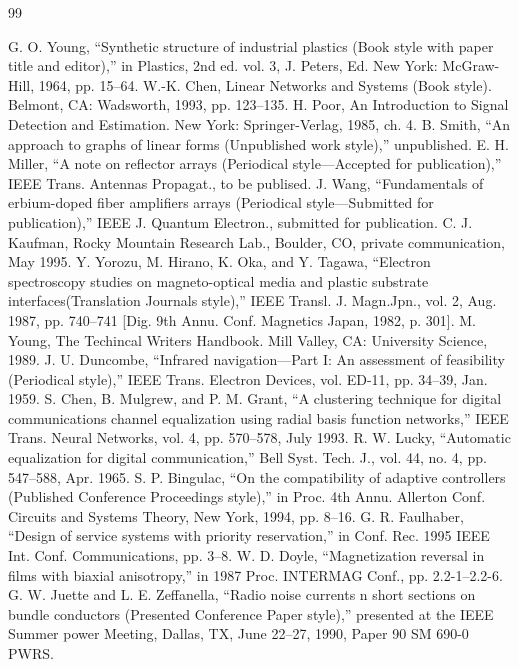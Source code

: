 \documentclass[letterpaper, 10 pt, conference]{ieeeconf}  %
\begin{document}
\begin{thebibliography}{99}

 G. O. Young, “Synthetic structure of industrial plastics (Book style with paper title and editor),” 	in Plastics, 2nd ed. vol. 3, J. Peters, Ed.  New York: McGraw-Hill, 1964, pp. 15–64.
 W.-K. Chen, Linear Networks and Systems (Book style).	Belmont, CA: Wadsworth, 1993, pp. 123–135.
 H. Poor, An Introduction to Signal Detection and Estimation.   New York: Springer-Verlag, 1985, ch. 4.
 B. Smith, “An approach to graphs of linear forms (Unpublished work style),” unpublished.
 E. H. Miller, “A note on reflector arrays (Periodical style—Accepted for publication),” IEEE Trans. Antennas Propagat., to be publised.
 J. Wang, “Fundamentals of erbium-doped fiber amplifiers arrays (Periodical style—Submitted for publication),” IEEE J. Quantum Electron., submitted for publication.
 C. J. Kaufman, Rocky Mountain Research Lab., Boulder, CO, private communication, May 1995.
 Y. Yorozu, M. Hirano, K. Oka, and Y. Tagawa, “Electron spectroscopy studies on magneto-optical media and plastic substrate interfaces(Translation Journals style),” IEEE Transl. J. Magn.Jpn., vol. 2, Aug. 1987, pp. 740–741 [Dig. 9th Annu. Conf. Magnetics Japan, 1982, p. 301].
 M. Young, The Techincal Writers Handbook.  Mill Valley, CA: University Science, 1989.
 J. U. Duncombe, “Infrared navigation—Part I: An assessment of feasibility (Periodical style),” IEEE Trans. Electron Devices, vol. ED-11, pp. 34–39, Jan. 1959.
 S. Chen, B. Mulgrew, and P. M. Grant, “A clustering technique for digital communications channel equalization using radial basis function networks,” IEEE Trans. Neural Networks, vol. 4, pp. 570–578, July 1993.
 R. W. Lucky, “Automatic equalization for digital communication,” Bell Syst. Tech. J., vol. 44, no. 4, pp. 547–588, Apr. 1965.
 S. P. Bingulac, “On the compatibility of adaptive controllers (Published Conference Proceedings style),” in Proc. 4th Annu. Allerton Conf. Circuits and Systems Theory, New York, 1994, pp. 8–16.
 G. R. Faulhaber, “Design of service systems with priority reservation,” in Conf. Rec. 1995 IEEE Int. Conf. Communications, pp. 3–8.
 W. D. Doyle, “Magnetization reversal in films with biaxial anisotropy,” in 1987 Proc. INTERMAG Conf., pp. 2.2-1–2.2-6.
 G. W. Juette and L. E. Zeffanella, “Radio noise currents n short sections on bundle conductors (Presented Conference Paper style),” presented at the IEEE Summer power Meeting, Dallas, TX, June 22–27, 1990, Paper 90 SM 690-0 PWRS.

\end{thebibliography}
\end{document}

